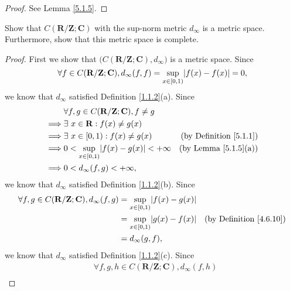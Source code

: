 \begin{proof}
    See Lemma \ref{5.1.5}.
\end{proof}

\begin{exercise}\label{ex 5.1.3}
    Show that \(C(\mathbf{R} / \mathbf{Z} ; \mathbf{C})\) with the sup-norm metric \(d_\infty\) is a metric space.
    Furthermore, show that this metric space is complete.
\end{exercise}

\begin{proof}
    First we show that \(\big(C(\mathbf{R} / \mathbf{Z} ; \mathbf{C}), d_\infty\big)\) is a metric space.
    Since
    \[
        \forall f \in C(\mathbf{R} / \mathbf{Z} ; \mathbf{C}), d_\infty(f, f) = \sup_{x \in [0, 1)} \abs*{f(x) - f(x)} = 0,
    \]
    we know that \(d_\infty\) satisfied Definition \ref{1.1.2}(a).
    Since
    \begin{align*}
                 & \forall f, g \in C(\mathbf{R} / \mathbf{Z} ; \mathbf{C}), f \neq g                                      \\
        \implies & \exists\ x \in \mathbf{R} : f(x) \neq g(x)                                                              \\
        \implies & \exists\ x \in [0, 1) : f(x) \neq g(x)                             & \text{(by Definition \ref{5.1.1})} \\
        \implies & 0 < \sup_{x \in [0, 1)} \abs*{f(x) - g(x)} < +\infty               & \text{(by Lemma \ref{5.1.5}(a))}   \\
        \implies & 0 < d_\infty(f, g) < +\infty,
    \end{align*}
    we know that \(d_\infty\) satisfied Definition \ref{1.1.2}(b).
    Since
    \begin{align*}
        \forall f, g \in C(\mathbf{R} / \mathbf{Z} ; \mathbf{C}), d_\infty(f, g) & = \sup_{x \in [0, 1)} \abs*{f(x) - g(x)}                                       \\
                                                                                 & = \sup_{x \in [0, 1)} \abs*{g(x) - f(x)} & \text{(by Definition \ref{4.6.10})} \\
                                                                                 & = d_\infty(g, f),
    \end{align*}
    we know that \(d_\infty\) satisfied Definition \ref{1.1.2}(c).
    Since
    \begin{align*}
         & \forall f, g, h \in C(\mathbf{R} / \mathbf{Z} ; \mathbf{C}), d_\infty(f, h)                                  \\

\end{align*}
\end{proof}
